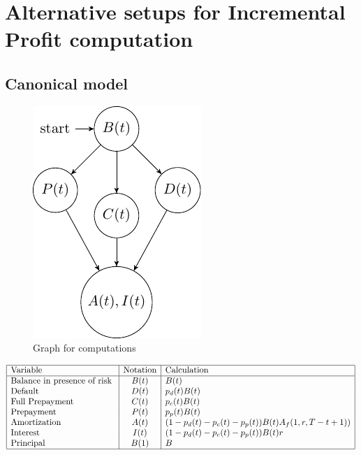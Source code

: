 \section{Alternative setups for Incremental Profit computation}



\subsection{Canonical model \label{can}} 
\begin{figure}[H]
  \centering
      \includegraphics[width=.3\textwidth]{Graph2.pdf} 
 \caption{Graph for computations}
 \label{fig:graph2}
\end{figure}

\begin{center} %
\[ %
\begin{array}{|l|c|l|} \hline %
\mbox{Variable} &\mbox{Notation} & \mbox{Calculation}\\ \hline
\mbox{Balance in presence of risk }  & B(t)  & B(t)\\
\mbox{Default  }  & D(t) & p_d(t) B(t)\\
\mbox{Full Prepayment}  & C(t) & p_c(t) B(t)\\
\mbox{Prepayment  }  & P(t) & p_p(t)B(t)\\
\mbox{Amortization}  & A(t) &(1-p_d(t)-p_c(t)-p_p(t)) B(t)A_f(1,r,T-t+1))\\
\mbox{Interest }  & I(t) & (1-p_d(t)-p_c(t)-p_p(t))B(t)r\\
\mbox{Principal   }  &  B(1) & B\\
\hline
\end{array} %
\] %
\end{center}

